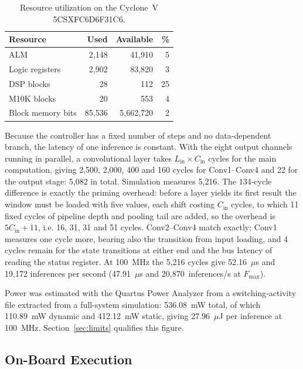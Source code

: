 \documentclass[conference,10pt]{IEEEtran}
\begin{document}
\begin{table}[t]
\caption{Resource utilization on the Cyclone~V 5CSXFC6D6F31C6.}
\label{tab:res}
\centering
\footnotesize
\begin{tabular}{lrrr}
\toprule
Resource & Used & Available & \% \\
\midrule
ALM               & 2{,}148 & 41{,}910 & 5 \\
Logic registers   & 2{,}902 & 83{,}820 & 3 \\
DSP blocks        & 28      & 112      & 25 \\
M10K blocks       & 20      & 553      & 4 \\
Block memory bits & 85{,}536 & 5{,}662{,}720 & 2 \\
\bottomrule
\end{tabular}
\end{table}

Because the controller has a fixed number of steps and no data-dependent branch,
the latency of one inference is constant. With the eight output channels running
in parallel, a convolutional layer takes $L_{\text{in}} \times C_{\text{in}}$
cycles for the main computation, giving 2{,}500, 2{,}000, 400 and 160 cycles for
Conv1--Conv4 and 22 for the output stage: 5{,}082 in total. Simulation measures
5{,}216. The 134-cycle difference is exactly the priming overhead: before a layer
yields its first result the window must be loaded with five values, each shift
costing $C_{\text{in}}$ cycles, to which 11 fixed cycles of pipeline depth and
pooling tail are added, so the overhead is $5C_{\text{in}}+11$, i.e. 16, 31, 31
and 51 cycles. Conv2--Conv4 match exactly; Conv1 measures one cycle more, bearing
also the transition from input loading, and 4 cycles remain for the state
transitions at either end and the bus latency of reading the status register.
At 100~MHz the 5{,}216 cycles give 52.16~$\mu$s and 19{,}172 inferences per
second (47.91~$\mu$s and 20{,}870~inferences/s at $F_{\max}$).

Power was estimated with the Quartus Power Analyzer from a switching-activity
file extracted from a full-system simulation: 536.08~mW total, of which
110.89~mW dynamic and 412.12~mW static, giving 27.96~$\mu$J per inference at
100~MHz. Section~\ref{sec:limits} qualifies this figure.

\subsection{On-Board Execution}
\end{document}

